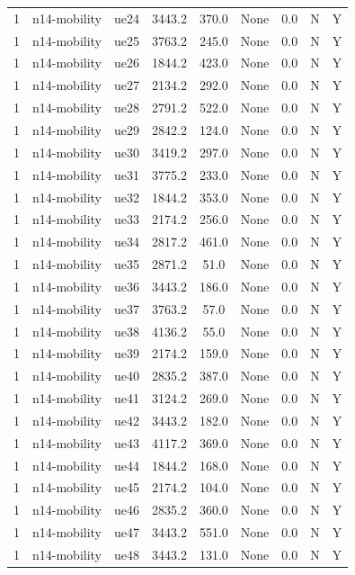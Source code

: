 \begin{table}[ht]
\begin{tabular}{|c|c|c|c|c|c|c|c|c|}
1 & n14-mobility & ue24 & 3443.2 & 370.0 & None & 0.0 & N & Y \\
1 & n14-mobility & ue25 & 3763.2 & 245.0 & None & 0.0 & N & Y \\
1 & n14-mobility & ue26 & 1844.2 & 423.0 & None & 0.0 & N & Y \\
1 & n14-mobility & ue27 & 2134.2 & 292.0 & None & 0.0 & N & Y \\
1 & n14-mobility & ue28 & 2791.2 & 522.0 & None & 0.0 & N & Y \\
1 & n14-mobility & ue29 & 2842.2 & 124.0 & None & 0.0 & N & Y \\
1 & n14-mobility & ue30 & 3419.2 & 297.0 & None & 0.0 & N & Y \\
1 & n14-mobility & ue31 & 3775.2 & 233.0 & None & 0.0 & N & Y \\
1 & n14-mobility & ue32 & 1844.2 & 353.0 & None & 0.0 & N & Y \\
1 & n14-mobility & ue33 & 2174.2 & 256.0 & None & 0.0 & N & Y \\
1 & n14-mobility & ue34 & 2817.2 & 461.0 & None & 0.0 & N & Y \\
1 & n14-mobility & ue35 & 2871.2 & 51.0 & None & 0.0 & N & Y \\
1 & n14-mobility & ue36 & 3443.2 & 186.0 & None & 0.0 & N & Y \\
1 & n14-mobility & ue37 & 3763.2 & 57.0 & None & 0.0 & N & Y \\
1 & n14-mobility & ue38 & 4136.2 & 55.0 & None & 0.0 & N & Y \\
1 & n14-mobility & ue39 & 2174.2 & 159.0 & None & 0.0 & N & Y \\
1 & n14-mobility & ue40 & 2835.2 & 387.0 & None & 0.0 & N & Y \\
1 & n14-mobility & ue41 & 3124.2 & 269.0 & None & 0.0 & N & Y \\
1 & n14-mobility & ue42 & 3443.2 & 182.0 & None & 0.0 & N & Y \\
1 & n14-mobility & ue43 & 4117.2 & 369.0 & None & 0.0 & N & Y \\
1 & n14-mobility & ue44 & 1844.2 & 168.0 & None & 0.0 & N & Y \\
1 & n14-mobility & ue45 & 2174.2 & 104.0 & None & 0.0 & N & Y \\
1 & n14-mobility & ue46 & 2835.2 & 360.0 & None & 0.0 & N & Y \\
1 & n14-mobility & ue47 & 3443.2 & 551.0 & None & 0.0 & N & Y \\
1 & n14-mobility & ue48 & 3443.2 & 131.0 & None & 0.0 & N & Y \\

\end{tabular}
\end{table}
